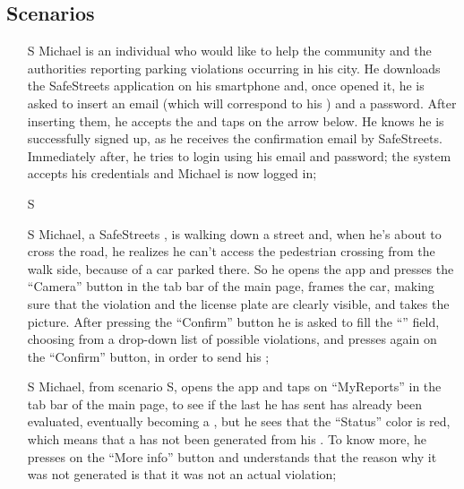 \documentclass[../../../rasd.tex]{subfiles}
\begin{document}
\subsection{Scenarios\label{sect:3.2.1}}

\begin{itemize}
	\item[S\subs{1}]Michael is an individual who would like to help the community and the authorities reporting parking violations occurring in his city. He downloads the SafeStreets application on his smartphone and, once opened it, he is asked to insert an email (which will correspond to his ) and a password. After inserting them, he accepts the  and taps on the arrow below. He knows he is successfully signed up, as he receives the confirmation email by SafeStreets. Immediately after, he tries to login using his email and password; the system accepts his credentials and Michael is now logged in;
	
	\item[S\subs{2}]
	
	\item[S\subs{3}]Michael, a SafeStreets , is walking down a street and, when he’s about to cross the road, he realizes he can’t access the pedestrian crossing from the walk side, because of a car parked there. So he opens the app and presses the “Camera” button in the tab bar of the main page, frames the car, making sure that the violation and the license plate are clearly visible, and takes the picture. After pressing the “Confirm” button he is asked to fill the “” field, choosing from a drop-down list of possible violations, and presses again on the “Confirm” button, in order to send his ;
	
	\item[S\subs{4}]Michael, from scenario S, opens the app and taps on “MyReports” in the tab bar of the main page, to see if the last  he has sent has already been evaluated, eventually becoming a , but he sees that the  “Status” color is red, which means that a  has not been generated from his . To know more, he presses on the “More info” button and understands that the reason why it was not generated is that it was not an actual violation;
	

\end{itemize}
\end{document}
